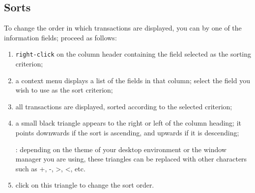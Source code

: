 \subsection{Sorts\label{transactions-list-sorts}}

To change the order in which transactions are displayed, you can  by one of the information fields; proceed as follows:

\begin{enumerate}
	\item \texttt{right-click} on the column header containing the field selected as the \gls{sorting} criterion;
	\item a context menu displays a list of the fields in that column; select the field you wish to use as the sort criterion;
	\item all transactions are displayed, sorted according to the selected criterion;
	\item a small black triangle appears to the right or left of the column heading; it points downwards if the sort is ascending, and upwards if it is descending;

	\Note{}: depending on the theme of your desktop environment or the window manager you are using, these triangles can be replaced with other characters such as +, -, >, <, etc.
	\item click on this triangle to change the sort order.
\end{enumerate}

